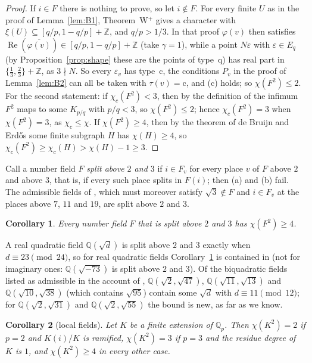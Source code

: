 \documentclass[11pt,a4paper]{amsart}
\newtheorem{corollary}{Corollary}
\theoremstyle{remark}
\newcommand{\Q}{\mathbb{Q}}
\newcommand{\Z}{\mathbb{Z}}
\begin{document}
\begin{proof}
If $i\in F$ there is nothing to prove, so let $i\notin F$. For every finite $U$ as in the proof of
Lemma~\ref{lem:B1}, Theorem~W$^+$ gives a character with $\xi(U)\subseteq[q/p,1-q/p]+\Z$, and
$q/p>1/3$. In that proof $\varphi(v)$ then satisfies $\operatorname{Re}(\overline{\varphi(v)})\in[q/p,1-q/p]+\Z$ (take
$\gamma=1$), while a point $N\varepsilon$ with $\varepsilon\in E_q$ (by Proposition~\ref{prop:shape} these are the
points of type~q) has real part in $\{\frac13,\frac23\}+\Z$, as $3\nmid N$. So every $\varepsilon_v$ has type~c, the conditions $P_v$ in the proof of Lemma~\ref{lem:B2} can all
be taken with $\tau(v)=\mathrm c$, and (c) holds; so $\chi(F^2)\le2$. For the second statement: if
$\chi_c(F^2)<3$, then by the definition of the infimum $F^2$ maps to some $K_{p/q}$ with $p/q<3$, so $\chi(F^2)\le2$;
hence $\chi_c(F^2)=3$ when $\chi(F^2)=3$, as $\chi_c\le\chi$. If $\chi(F^2)\ge4$, then by the theorem of de Bruijn and
Erd\H{o}s \cite{dBE} some finite subgraph $H$ has $\chi(H)\ge4$, so $\chi_c(F^2)\ge\chi_c(H)>\chi(H)-1\ge3$.
\end{proof}

Call a number field $F$ \emph{split above $2$ and $3$} if $i\in F_v$ for every place $v$ of $F$ above $2$ and above
$3$, that is, if every such place splits in $F(i)$; then (a) and (b) fail. The admissible fields of
\cite[Section~4]{TC}, which must moreover satisfy $\sqrt3\notin F$ and $i\in F_v$ at the places above $7$, $11$ and
$19$, are split above $2$ and $3$.

\begin{corollary}\label{cor:B7}
Every number field $F$ that is split above $2$ and $3$ has $\chi(F^2)\ge4$.
\end{corollary}

A real quadratic field $\Q(\sqrt d)$ is split above $2$ and $3$ exactly when $d\equiv23\pmod{24}$, so for real
quadratic fields Corollary~\ref{cor:B7} is contained in \cite{FC} (not for imaginary ones: $\Q(\sqrt{-73})$ is split
above $2$ and $3$). Of the biquadratic fields listed as admissible in the account
of \cite[\nolinkurl{notes/local_global.md}, Section~4]{Repo}, $\Q(\sqrt2,\sqrt{47})$, $\Q(\sqrt{11},\sqrt{13})$ and
$\Q(\sqrt{10},\sqrt{38})$ (which contains $\sqrt{95}$) contain some $\sqrt d$ with $d\equiv11\pmod{12}$; for
$\Q(\sqrt2,\sqrt{31})$ and $\Q(\sqrt2,\sqrt{55})$ the bound is new, as far as we know.

\begin{corollary}[local fields]\label{cor:local}
Let $K$ be a finite extension of $\Q_p$. Then $\chi(K^2)=2$ if $p=2$ and $K(i)/K$ is ramified, $\chi(K^2)=3$ if
$p=3$ and the residue degree of $K$ is $1$, and $\chi(K^2)\ge4$ in every other case.
\end{corollary}
\end{document}
